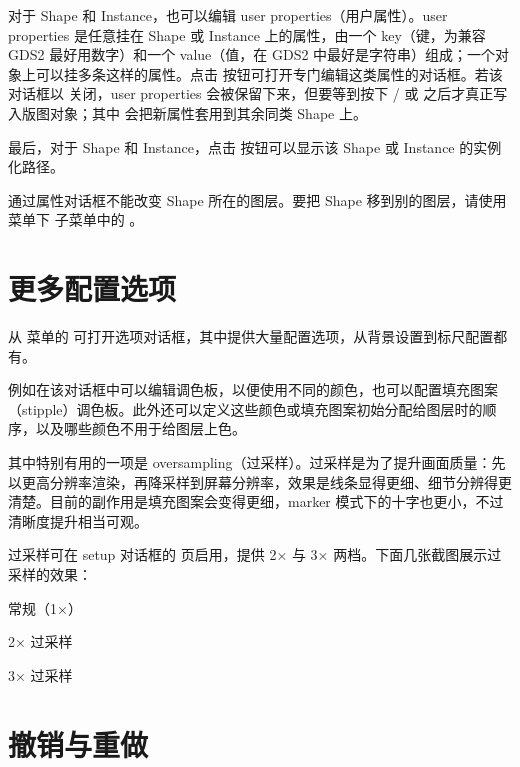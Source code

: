 对于 Shape 和 Instance，也可以编辑 user properties（用户属性）。user properties 是任意挂在 Shape 或 Instance 上的属性，由一个 key（键，为兼容 GDS2 最好用数字）和一个 value（值，在 GDS2 中最好是字符串）组成；一个对象上可以挂多条这样的属性。点击  按钮可打开专门编辑这类属性的对话框。若该对话框以  关闭，user properties 会被保留下来，但要等到按下  /  或  之后才真正写入版图对象；其中  会把新属性套用到其余同类 Shape 上。

最后，对于 Shape 和 Instance，点击  按钮可以显示该 Shape 或 Instance 的实例化路径。

通过属性对话框不能改变 Shape 所在的图层。要把 Shape 移到别的图层，请使用  菜单下  子菜单中的 。

\section{更多配置选项}\label{sec:setup}

从  菜单的  可打开选项对话框，其中提供大量配置选项，从背景设置到标尺配置都有。

例如在该对话框中可以编辑调色板，以便使用不同的颜色，也可以配置填充图案（stipple）调色板。此外还可以定义这些颜色或填充图案初始分配给图层时的顺序，以及哪些颜色不用于给图层上色。

其中特别有用的一项是 oversampling（过采样）。过采样是为了提升画面质量：先以更高分辨率渲染，再降采样到屏幕分辨率，效果是线条显得更细、细节分辨得更清楚。目前的副作用是填充图案会变得更细，marker 模式下的十字也更小，不过清晰度提升相当可观。

过采样可在 setup 对话框的  页启用，提供 2× 与 3× 两档。下面几张截图展示过采样的效果：

\begin{kldesc}
\item 常规（1×）
\end{kldesc}

\begin{kldesc}
\item 2× 过采样
\end{kldesc}

\begin{kldesc}
\item 3× 过采样
\end{kldesc}

\section{撤销与重做}\label{sec:undo_redo}

